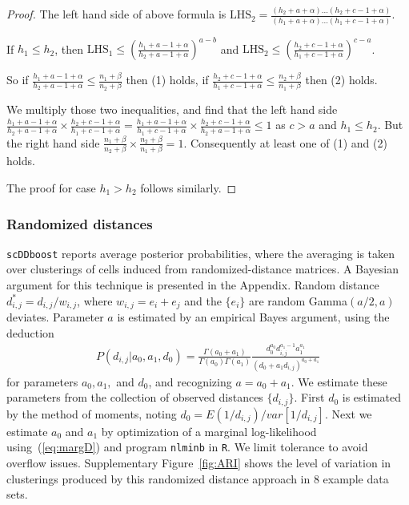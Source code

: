 \documentclass[aoas,preprint]{imsart}
\begin{document}
\begin{proof}
 The left hand side of above formula is $\text{LHS}_2 = \frac{(h_2 + a + \alpha)...(h_2 + c - 1 + \alpha)}{(h_1 + a + \alpha) ... (h_1 + c - 1 + \alpha)}$.

If $h_1 \leq h_2$, then $\text{LHS}_1 \leq (\frac{h_1 + a - 1 + \alpha}{h_2 + a  - 1 + \alpha})^{a - b}$ and $\text{LHS}_2 \leq (\frac{h_2 + c - 1 + \alpha}{h_1 + c  - 1 + \alpha})^{c - a}$.

So if $\frac{h_1 + a - 1 + \alpha}{h_2 + a  - 1 + \alpha} \leq \frac{n_1 + \beta}{n_2 + \beta} $ then (1) holds, if $\frac{h_2 + c - 1 + \alpha}{h_1 + c  - 1 + \alpha} \leq \frac{n_2 + \beta}{n_1 + \beta}$ then (2) holds.

We multiply those two inequalities, and find that the left hand side $\frac{h_1 + a - 1 + \alpha}{h_2 + a  - 1 + \alpha}  \times \frac{h_2 + c - 1 + \alpha}{h_1 + c  - 1 + \alpha} = \frac{h_1 + a - 1 + \alpha}{h_1 + c  - 1 + \alpha} \times  \frac{h_2 + c - 1 + \alpha}{h_2 + a  - 1 + \alpha} \leq 1$ as $c > a$ and $h_1 \leq h_2$. 
But the right hand side $\frac{n_1 + \beta}{n_2 + \beta} \times \frac{n_2 + \beta}{n_1 + \beta} = 1$. Consequently at least one of (1) and (2) holds.

The proof for case $h_1 > h_2$ follows similarly.




\end{proof}




\subsubsection*{Randomized distances}

\texttt{scDDboost} reports average posterior probabilities, where the averaging is taken over
 clusterings of cells induced from randomized-distance matrices.  A Bayesian argument for this 
technique is presented in the Appendix.  Random distance $d^*_{i,j} = d_{i,j}/w_{i,j}$, where
$w_{i,j}=e_i + e_j$ and the $\{e_i\}$ are random Gamma$( a/2,  a )$ deviates.   Parameter $a$
is estimated by an empirical Bayes argument, using the deduction 
\begin{eqnarray}
\label{eq:margD}
P(d_{i,j} | a_0, a_1, d_0) = \frac{\Gamma(a_0 + a_1)}{\Gamma(a_0)\Gamma(a_1)} \frac{d_0^{a_0} d_{i,j}^{a_1 - 1}a_1^{a_1}}{(d_0 + a_1  d_{i,j})^{a_0 + a_1}}
\end{eqnarray}
for parameters $a_0, a_1, $ and $d_0$, and recognizing $a = a_0+a_1$.  We estimate these parameters
from the collection of observed distances $\{ d_{i,j} \}$.  First $d_0$ is estimated by the method
of moments, noting $d_0=E( 1/d_{i,j} )/var[ 1/d_{i,j} ]$. 
Next we estimate $a_0$ and $a_1$ by 
optimization of a marginal log-likelihood using~(\ref{eq:margD}) and program \verb+nlminb+ in \verb+R+.
We limit tolerance to avoid overflow issues. Supplementary Figure~\ref{fig:ARI} shows the level of 
variation in clusterings produced by this randomized distance approach in 8 example data sets.
\end{document}
